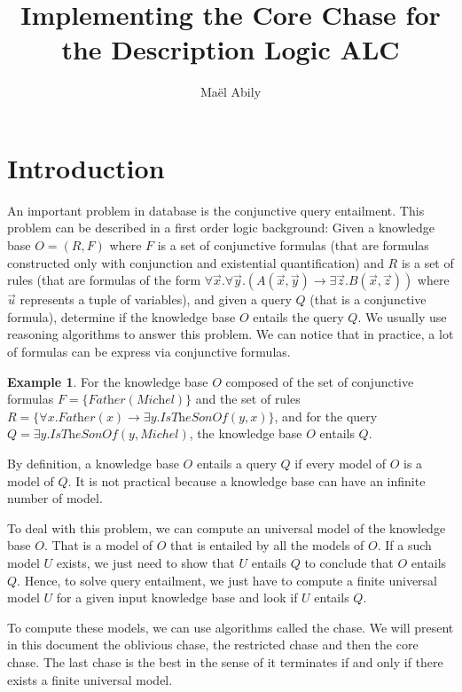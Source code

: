 \documentclass{article}
\title{Implementing the Core Chase for the Description Logic ALC}
\author{Maël Abily}
\theoremstyle{definition}
\newtheorem{example}{Example}[section]
\theoremstyle{remark}
\begin{document}
\maketitle						%



\section{Introduction}

An important problem in database is the conjunctive query entailment. This problem can be described in a first order logic background: Given a knowledge base $O = (R,F)$ where $F$ is a set of conjunctive formulas (that are formulas constructed only with conjunction and existential quantification) and $R$ is a set of  rules (that are formulas of the form $\forall \vec x.\forall \vec y.( A(\vec x,\vec y) \rightarrow \exists \vec z. B(\vec x,\vec z))$ where $\vec u$ represents a tuple of variables), and given a query $Q$ (that is a conjunctive formula), determine if the knowledge base $O$ entails the query $Q$. We usually use reasoning algorithms to answer this problem. We can notice that in practice, a lot of formulas can be express via conjunctive formulas.

\begin{example}
For the knowledge base $O$ composed of the set of conjunctive formulas $F = \{\textit{Father}(\textit{Michel}) \}$ and the set of rules $R= \{\forall x. \textit{Father}(x) \rightarrow \exists y. \textit{IsTheSonOf}(y,x) \}$, and for the query $Q = \exists y. \textit{IsTheSonOf}(y,Michel)$, the knowledge base $O$ entails $Q$.
\end{example}

By definition, a knowledge base $O$ entails a query $Q$ if every  model of $O$ is a model of $Q$. It is not practical because a knowledge base can have an infinite number of model.

To deal with this problem, we can compute an universal model of the knowledge base $O$. That is a model of $O$ that is entailed by all the models of $O$. If a such model $U$ exists, we just need to show that $U$ entails $Q$ to conclude that $O$ entails $Q$. Hence, to solve query entailment, we just have to compute a finite universal model $U$ for a given input knowledge base and look if $U$ entails $Q$.

To compute these models, we can use algorithms called the chase. We will present in this document the oblivious chase, the restricted chase and then the core chase. The last chase is the best in the sense of it terminates if and only if there exists a finite universal model. 
\end{document}
